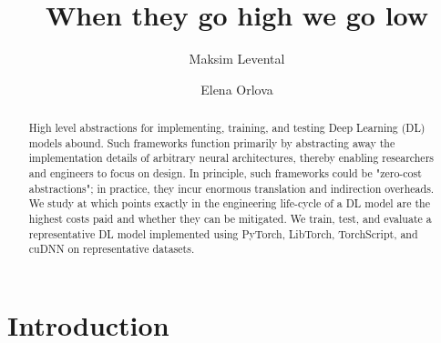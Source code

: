 \documentclass[sigconf]{acmart}
\begin{document}
\title{When they go high we go low}

\author{Maksim Levental}
\author{Elena Orlova}

\renewcommand{\shortauthors}{Levental and Orlova}

\begin{abstract}
  High level abstractions for implementing, training, and testing Deep Learning (DL) models abound.
  Such frameworks function primarily by abstracting away the implementation details of arbitrary neural architectures, thereby enabling researchers and engineers to focus on design.
  In principle, such frameworks could be "zero-cost abstractions";
  in practice, they incur enormous translation and indirection overheads.
  We study at which points exactly in the engineering life-cycle of a DL model are the highest costs paid and whether they can be mitigated.
  We train, test, and evaluate a representative DL model implemented using PyTorch, LibTorch, TorchScript, and cuDNN on representative datasets.
\end{abstract}



\maketitle

\section{Introduction}\label{sec:introduction}
\end{document}
